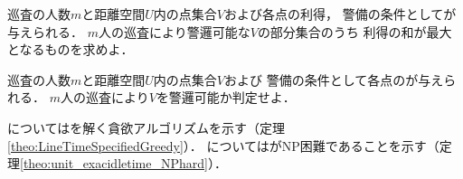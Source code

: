 \begin{timeSpecifiedPatrollingProblem}
巡査の人数$m$と距離空間$U$内の点集合$V$および各点の利得，
警備の条件として{\exactIdletime}が与えられる．
$m$人の巡査により警邏可能な$V$の部分集合のうち
利得の和が最大となるものを求めよ．
\end{timeSpecifiedPatrollingProblem}

\begin{timeSpecifiedPatrollingProblemDecision}
巡査の人数$m$と距離空間$U$内の点集合$V$および
警備の条件として各点の{\exactIdletime}が与えられる．
$m$人の巡査により$V$を警邏可能か判定せよ．
\end{timeSpecifiedPatrollingProblemDecision}


{\graphLine}については{\timeSpecifiedPatProbDecision}を解く貪欲アルゴリズムを示す（定理\ref{theo:LineTimeSpecifiedGreedy}）．
{\graphUnit}については{\timeSpecifiedPatProb}がNP困難であることを示す（定理\ref{theo:unit_exacidletime_NPhard}）．
